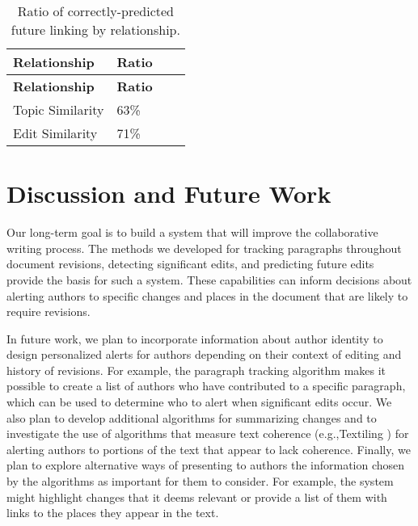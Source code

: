 \begin{longtable}[c]{@{}llll@{}}
\caption{Ratio of correctly-predicted future linking by
relationship.{}}\tabularnewline
\toprule
\textbf{Relationship} & \textbf{Ratio} & &\tabularnewline
\midrule
\endfirsthead
\toprule
\textbf{Relationship} & \textbf{Ratio} & &\tabularnewline
\midrule
\endhead
Topic Similarity & 63\% & &\tabularnewline
Edit Similarity & 71\% & &\tabularnewline
\bottomrule
\end{longtable}

\section{Discussion and Future Work}\label{discussion-and-future-work}

Our long-term goal is to build a system that will improve the
collaborative writing process. The methods we developed for tracking
paragraphs throughout document revisions, detecting significant edits,
and predicting future edits provide the basis for such a system. These
capabilities can inform decisions about alerting authors to specific
changes and places in the document that are likely to require revisions.

In future work, we plan to incorporate information about author identity
to design personalized alerts for authors depending on their context of
editing and history of revisions. For example, the paragraph tracking
algorithm makes it possible to create a list of authors who have
contributed to a specific paragraph, which can be used to determine who
to alert when significant edits occur. We also plan to develop
additional algorithms for summarizing changes and to investigate the use
of algorithms that measure text coherence (e.g.,Textiling
\cite{hearst1994multi}) for alerting authors to portions of the text
that appear to lack coherence. Finally, we plan to explore alternative
ways of presenting to authors the information chosen by the algorithms
as important for them to consider. For example, the system might
highlight changes that it deems relevant or provide a list of them with
links to the places they appear in the text.
